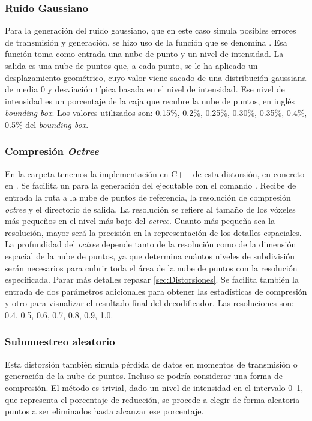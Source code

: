 \subsubsection{Ruido Gaussiano} 
Para la generación del ruido gaussiano, que en este caso simula posibles 
errores de transmisión y generación, se hizo uso de la función que se denomina
. 
Esa función toma como entrada 
una nube de punto y un nivel de intensidad. La salida es una nube de puntos que, 
a cada punto, se le ha aplicado un desplazamiento geométrico, cuyo valor 
viene sacado de una distribución gaussiana de media 0 y desviación típica 
basada en el nivel de intensidad. Ese nivel de intensidad es un porcentaje 
de la caja que recubre la nube de puntos, en inglés \emph{bounding box}.
Los valores utilizados son: 0.15\%, 0.2\%, 0.25\%, 0.30\%, 0.35\%, 0.4\%, 0.5\%
del \emph{bounding box}.
\subsubsection{Compresión \emph{Octree}}
En la carpeta  tenemos la implementación en C++ de esta 
distorsión, en concreto en . Se facilita 
un  para la generación del ejecutable con el comando 
. Recibe de entrada la ruta a la nube de puntos de referencia, 
la resolución de compresión \emph{octree} y el directorio de salida. 
La resolución se refiere al tamaño de los vóxeles más pequeños en el nivel más 
bajo del \emph{octree}. Cuanto más pequeña sea la resolución, mayor será la precisión 
en la representación de los detalles espaciales. 
La profundidad del \emph{octree} depende tanto de la resolución como de la dimensión 
espacial de la nube de puntos, ya que determina cuántos niveles de subdivisión 
serán necesarios para cubrir toda el área de la nube de puntos con la resolución 
especificada. Parar más detalles repasar \ref{sec:Distorsiones}. 
Se facilita también la entrada de dos parámetros adicionales para obtener 
las estadísticas de compresión y otro para visualizar el resultado final del 
decodificador. Las resoluciones son: 0.4, 0.5, 0.6, 0.7, 0.8, 0.9, 1.0.
\subsubsection{Submuestreo aleatorio}
Esta distorsión también simula pérdida de datos en momentos de transmisión o 
generación de la nube de puntos. Incluso se podría considerar una forma de 
compresión. El método es trivial, dado un nivel de intensidad en el intervalo 
0--1, que representa el porcentaje de reducción, se procede a elegir de forma 
aleatoria puntos a ser eliminados hasta alcanzar ese porcentaje.  

